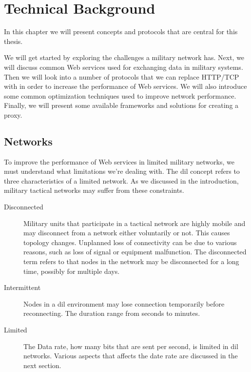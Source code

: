 \chapter{Technical Background}

In this chapter we will present concepts and protocols that are central for
this thesis.

We will get started by exploring the challenges a military network has. Next, we
will discuss common Web services used for exchanging data in military systems.
Then we will look into a number of protocols that we can replace HTTP/TCP with
in order to increase the performance of Web services. We will also introduce
some common optimization techniques used to improve network performance.
Finally, we will present some available frameworks and solutions for creating a
proxy.

\section{ Networks}
\label{dil}

To improve the performance of Web services in limited military networks, we
must understand what limitations we're dealing with. The \gls{dil} concept refers
to three characteristics of a limited network. As we discussed in the
introduction, military tactical networks may suffer from these constraints.

\begin{description}
\item[Disconnected]
Military units that participate in a tactical network are highly mobile
and may disconnect from a network either voluntarily or not. This causes
topology changes. Unplanned loss of connectivity can be due to various reasons,
such as loss of signal or equipment malfunction.  The disconnected term refers
to that nodes in the network may be disconnected for a long time, possibly for
multiple days.

\item[Intermittent]

Nodes in a \gls{dil} environment may lose connection temporarily before
reconnecting. The duration range from seconds to minutes.

\item[Limited] The Data rate, how many bits that are sent per second, is limited
in \gls{dil} networks. Various aspects that affects the date rate are discussed
in the next section.

\end{description}

